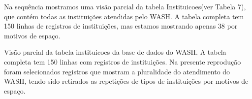 \documentclass[
12pt,		%
openright,	%
twoside,  %
a4paper,			%
chapter=TITLE,		%
english,			%
french,				%
spanish,			%
brazil				%
]{USPSC-classe/USPSC}
\begin{document}
Na sequ\^encia mostramos uma vis\~ao parcial da tabela \textquotedbl Instituicoes\textquotedbl  (ver Tabela 7), que cont\'em todas as institui\c{c}\~oes atendidas pelo WASH. A tabela completa tem 150 linhas de registros de institui\c{c}\~oes, mas estamos mostrando apenas 38 por motivos de espa\c{c}o.












\begin{table}[htb]
\tiny
\caption{\label{c51fa3974d4e9f7761c15281cff5d111963af87b}Vis\~ao parcial da tabela instituicoes da base de dados do WASH. A tabela completa tem 150 linhas com registros de institui\c{c}\~oes. Na presente reprodu\c{c}\~ao foram selecionados registros que mostram a pluralidade do atendimento do WASH, tendo sido retirados as repeti\c{c}\~oes de tipos de institui\c{c}\~oes por motivos de espa\c{c}o.}


\end{table}
\end{document}
